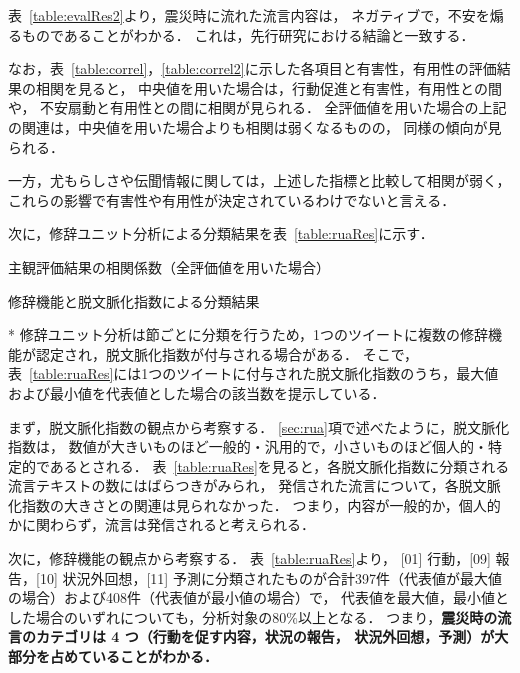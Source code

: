 \documentclass[japanese]{jnlp_1.4}
\begin{document}
表~\ref{table:evalRes2}より，震災時に流れた流言内容は，
ネガティブで，不安を煽るものであることがわかる．
これは，先行研究における結論\cite{Book_dema}と一致する．

なお，表~\ref{table:correl}，\ref{table:correl2}に示した各項目と有害性，有用性の評価結果の相関を見ると，
中央値を用いた場合は，行動促進と有害性，有用性との間や，
不安扇動と有用性との間に相関が見られる．
全評価値を用いた場合の上記の関連は，中央値を用いた場合よりも相関は弱くなるものの，
同様の傾向が見られる．

一方，尤もらしさや伝聞情報に関しては，上述した指標と比較して相関が弱く，
これらの影響で有害性や有用性が決定されているわけでないと言える．



次に，修辞ユニット分析による分類結果を表~\ref{table:ruaRes}に示す．

\begin{table}[b]
\caption{主観評価結果の相関係数（全評価値を用いた場合）}
\label{table:correl2}

\end{table}
\begin{table}[b]
\caption{修辞機能と脱文脈化指数による分類結果}
\label{table:ruaRes}

\vspace{0.5zw}\small
* 修辞ユニット分析は節ごとに分類を行うため，1つのツイートに複数の修辞機能が認定され，脱文脈化指数が付与される場合がある．
そこで，表~\ref{table:ruaRes}には1つのツイートに付与された脱文脈化指数のうち，最大値および最小値を代表値とした場合の該当数を提示している．\par
\end{table}

まず，脱文脈化指数の観点から考察する．
\ref{sec:rua}項で述べたように，脱文脈化指数は，
数値が大きいものほど一般的・汎用的で，小さいものほど個人的・特定的であるとされる．
表~\ref{table:ruaRes}を見ると，各脱文脈化指数に分類される流言テキストの数にはばらつきがみられ，
発信された流言について，各脱文脈化指数の大きさとの関連は見られなかった．
つまり，内容が一般的か，個人的かに関わらず，流言は発信されると考えられる．

次に，修辞機能の観点から考察する．
表~\ref{table:ruaRes}より，
[01] 行動，[09] 報告，[10] 状況外回想，[11] 予測に分類されたものが合計397件（代表値が最大値の場合）および408件（代表値が最小値の場合）で，
代表値を最大値，最小値とした場合のいずれについても，分析対象の80\%以上となる．
つまり，{\bf 震災時の流言のカテゴリは 4 つ（行動を促す内容，状況の報告，
  状況外回想，予測）が大部分を占めていることがわかる．}
\end{document}
